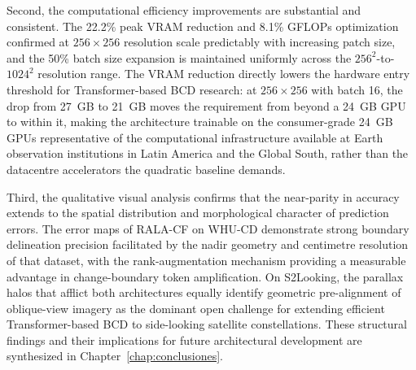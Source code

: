 Second, the computational efficiency improvements are substantial and consistent. The 22.2\% peak \ac{VRAM} reduction and 8.1\% \ac{GFLOPs} optimization confirmed at $256 \times 256$ resolution scale predictably with increasing patch size, and the 50\% batch size expansion is maintained uniformly across the $256^2$-to-$1024^2$ resolution range. The \ac{VRAM} reduction directly lowers the hardware entry threshold for Transformer-based \ac{BCD} research: at $256 \times 256$ with batch 16, the drop from 27~GB to 21~GB moves the requirement from beyond a 24~GB \ac{GPU} to within it, making the architecture trainable on the consumer-grade 24~GB \ac{GPU}s representative of the computational infrastructure available at Earth observation institutions in Latin America and the Global South, rather than the datacentre accelerators the quadratic baseline demands.

Third, the qualitative visual analysis confirms that the near-parity in accuracy extends to the spatial distribution and morphological character of prediction errors. The error maps of \ac{RALA-CF} on WHU-CD demonstrate strong boundary delineation precision facilitated by the nadir geometry and centimetre resolution of that dataset, with the rank-augmentation mechanism providing a measurable advantage in change-boundary token amplification. On S2Looking, the parallax halos that afflict both architectures equally identify geometric pre-alignment of oblique-view imagery as the dominant open challenge for extending efficient Transformer-based \ac{BCD} to side-looking satellite constellations. These structural findings and their implications for future architectural development are synthesized in Chapter~\ref{chap:conclusiones}.